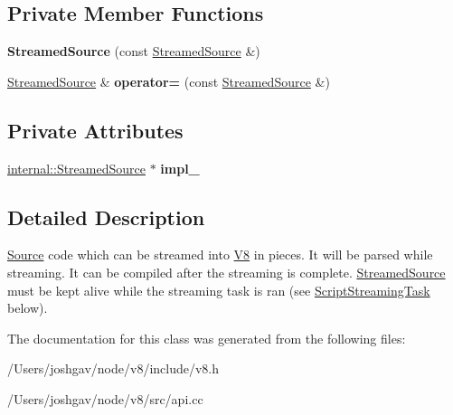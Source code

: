 \subsection*{Private Member Functions}
\begin{DoxyCompactItemize}
\item 
{\bfseries Streamed\+Source} (const \hyperlink{classv8_1_1_script_compiler_1_1_streamed_source}{Streamed\+Source} \&)\hypertarget{classv8_1_1_script_compiler_1_1_streamed_source_ad71bf1290a87bd01ed2d2b4b77e00562}{}\label{classv8_1_1_script_compiler_1_1_streamed_source_ad71bf1290a87bd01ed2d2b4b77e00562}

\item 
\hyperlink{classv8_1_1_script_compiler_1_1_streamed_source}{Streamed\+Source} \& {\bfseries operator=} (const \hyperlink{classv8_1_1_script_compiler_1_1_streamed_source}{Streamed\+Source} \&)\hypertarget{classv8_1_1_script_compiler_1_1_streamed_source_a0c5d7c6e8d02d190dafa4e6e5fa02c6b}{}\label{classv8_1_1_script_compiler_1_1_streamed_source_a0c5d7c6e8d02d190dafa4e6e5fa02c6b}

\end{DoxyCompactItemize}
\subsection*{Private Attributes}
\begin{DoxyCompactItemize}
\item 
\hyperlink{structv8_1_1internal_1_1_streamed_source}{internal\+::\+Streamed\+Source} $\ast$ {\bfseries impl\+\_\+}\hypertarget{classv8_1_1_script_compiler_1_1_streamed_source_a2155cae2a024035ef3c2d134fc84411d}{}\label{classv8_1_1_script_compiler_1_1_streamed_source_a2155cae2a024035ef3c2d134fc84411d}

\end{DoxyCompactItemize}


\subsection{Detailed Description}
\hyperlink{classv8_1_1_script_compiler_1_1_source}{Source} code which can be streamed into \hyperlink{classv8_1_1_v8}{V8} in pieces. It will be parsed while streaming. It can be compiled after the streaming is complete. \hyperlink{classv8_1_1_script_compiler_1_1_streamed_source}{Streamed\+Source} must be kept alive while the streaming task is ran (see \hyperlink{classv8_1_1_script_compiler_1_1_script_streaming_task}{Script\+Streaming\+Task} below). 

The documentation for this class was generated from the following files\+:\begin{DoxyCompactItemize}
\item 
/\+Users/joshgav/node/v8/include/v8.\+h\item 
/\+Users/joshgav/node/v8/src/api.\+cc\end{DoxyCompactItemize}
